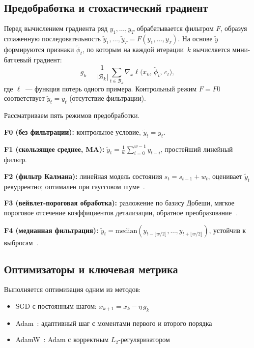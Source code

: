 \documentclass[conference]{IEEEtran}
\begin{document}
\subsection{Предобработка и стохастический градиент}

Перед вычислением градиента ряд $y_1,\dots,y_T$ обрабатывается фильтром
$F$, образуя сглаженную последовательность $\tilde{y}_1,\dots,\tilde{y}_T
= F(y_1,\dots,y_T)$. На основе $\tilde{y}$ формируются признаки
$\tilde{\phi}_t$, по которым на каждой итерации~$k$ вычисляется
мини-батчевый градиент:
\begin{equation}
  g_k = \frac{1}{|\mathcal{B}_k|}\sum_{t\in\mathcal{B}_k}
        \nabla_x \ell\bigl(x_k,\,\tilde{\phi}_t,\,c_t\bigr),
  \label{eq:grad}
\end{equation}
где $\ell$~--- функция потерь одного примера. Контрольный режим $F{=}F0$
соответствует $\tilde{y}_t = y_t$ (отсутствие фильтрации).

Рассматриваем пять режимов предобработки.

\textbf{F0 (без фильтрации):} контрольное условие, $\tilde{y}_t = y_t$.

\textbf{F1 (скользящее среднее, MA):}
$\tilde{y}_t = \frac{1}{w}\sum_{i=0}^{w-1}y_{t-i}$,
простейший линейный фильтр.

\textbf{F2 (фильтр Калмана):} линейная модель состояния
$s_t = s_{t-1} + w_t$, оценивает $\tilde{y}_t$ рекуррентно; оптимален
при гауссовом шуме~\cite{kalman1960}.

\textbf{F3 (вейвлет-пороговая обработка):} разложение по базису Добеши,
мягкое пороговое отсечение коэффициентов детализации, обратное
преобразование~\cite{donoho1994wavelets,daubechies1992wavelets,mallat1999wavelet}.

\textbf{F4 (медианная фильтрация):}
$\tilde{y}_t = \mathrm{median}(y_{t-\lfloor w/2\rfloor},\dots,
y_{t+\lfloor w/2\rfloor})$, устойчив к выбросам~\cite{yin1996median}.

\subsection{Оптимизаторы и ключевая метрика}

Выполняется оптимизация одним из методов:
\begin{itemize}
  \item SGD с постоянным шагом: $x_{k+1} = x_k - \eta\,g_k$
  \item Adam~\cite{kingma2015adam}: адаптивный шаг с моментами первого
        и второго порядка
  \item AdamW~\cite{loshchilov2019adamw}: Adam с корректным
        $L_2$-регуляризатором
\end{itemize}
\end{document}
